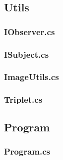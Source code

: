 \newpage
\subsection{Utils}
\subsubsection{IObserver.cs}
\newpage
\subsubsection{ISubject.cs}
\newpage
\subsubsection{ImageUtils.cs}
\newpage
\subsubsection{Triplet.cs}

\newpage
\subsection{Program}
\subsubsection{Program.cs}
